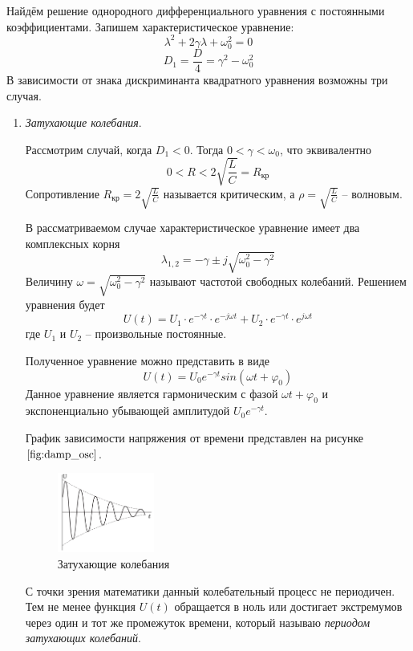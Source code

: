 Найдём решение однородного дифференциального уравнения с постоянными коэффициентами. Запишем характеристическое уравнение:
$$
\lambda^2 + 2\gamma \lambda + \omega_0^2 = 0
$$
$$
D_1 = \frac{D}{4} = \gamma^2 - \omega_0^2
$$
В зависимости от знака дискриминанта квадратного уравнения возможны три случая.

\begin{enumerate}
	\item \textit{Затухающие колебания}.
	
	Рассмотрим случай, когда $D_1 < 0$. Тогда $0 < \gamma < \omega_0$, что эквивалентно
	$$
	0 < R < 2 \sqrt{\frac{L}{C}} = R_{кр}
	$$
	Сопротивление $R_{кр} = 2 \sqrt{\frac{L}{C}}$ называется критическим, а $\rho = \sqrt{\frac{L}{C}}$ -- волновым.
	
	В рассматриваемом случае характеристическое уравнение имеет два комплексных корня 
	$$
	\lambda_{1,2} = -\gamma \pm j\sqrt{\omega_0^2 - \gamma^2}
	$$
	Величину $\omega = \sqrt{\omega_0^2 - \gamma^2}$ называют частотой свободных колебаний. Решением уравнения будет
	$$
	U(t) = U_1 \cdot e^{-\gamma t} \cdot e^{-j\omega t} + U_2 \cdot e^{-\gamma t} \cdot e^{j\omega t}
	$$
	где $U_1$ и $U_2$ -- произвольные постоянные.
	
	Полученное уравнение можно представить в виде
	\begin{equation*}
		U(t) = U_0 e^{-\gamma t} sin(\omega t + \varphi_0)
		\label{eq:damp_osc}
	\end{equation*}
	Данное уравнение является гармоническим с фазой $\omega t + \varphi_0$ и экспоненциально убывающей амплитудой $U_0 e^{-\gamma t}$.
	
	График зависимости напряжения от времени представлен на рисунке $\ref{fig:damp_osc}$.
	
	\begin{figure}[H]
		\vspace{-10pt}
		\centering
		\includegraphics[width=0.3\textwidth]{../res/damp_osc.png}
		\caption{Затухающие колебания}
		\label{fig:damp_osc}
	\end{figure}

	С точки зрения математики данный колебательный процесс не периодичен. Тем не менее функция $U(t)$ обращается в ноль или достигает экстремумов через один и тот же промежуток времени, который называю \textit{периодом затухающих колебаний}.
	

\end{enumerate}
